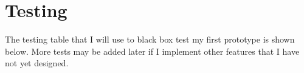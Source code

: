 \documentclass[../../../../main.tex]{subfiles}
\begin{document}
\section{Testing}
The testing table that I will use to black box test my first prototype is shown below. More tests may be added later if I implement other features that I have not yet designed.



\newpage
\end{document}
